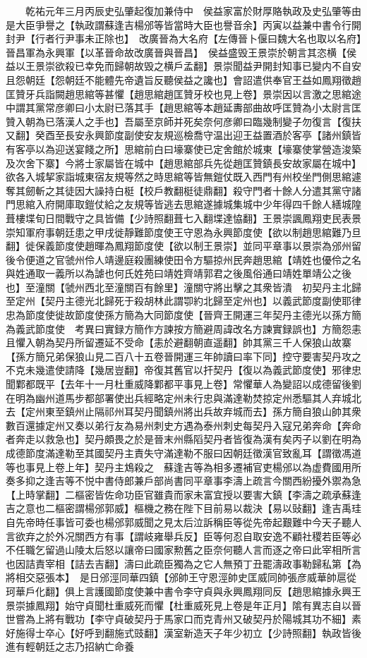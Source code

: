 　　乾祐元年三月丙辰史弘肇起復加兼侍中　侯益家富於財厚賂執政及史弘肇等由是大臣爭譽之【執政謂蘇逢吉楊邠等皆當時大臣也譽音余】丙寅以益兼中書令行開封尹【行者行尹事未正除也】　改廣晉為大名府【左傳晉卜偃曰魏大名也取以名府】晉昌軍為永興軍【以革晉命故改廣晉與晉昌】　侯益盛毁王景崇於朝言其恣横【侯益以王景崇欲殺已幸免而歸朝故毁之横戶孟翻】景崇聞益尹開封知事已變内不自安且怨朝廷【怨朝廷不能體先帝遺旨反聽侯益之讒也】會詔遣供奉官王益如鳳翔徵趙匡贊牙兵詣闕趙思綰等甚懼【趙思綰趙匡贊牙校也見上卷】景崇因以言激之思綰途中謂其黨常彦卿曰小太尉已落其手【趙思綰等本趙延夀部曲故呼匡贊為小太尉言匡贊入朝為已落漢人之手也】吾屬至京師并死矣奈何彦卿曰臨幾制變子勿復言【復扶又翻】癸酉至長安永興節度副使安友規巡檢喬守温出迎王益置酒於客亭【諸州鎮皆有客亭以為迎送宴餞之所】思綰前白曰壕寨使已定舍館於城東【壕寨使掌營造浚築及次舍下寨】今將士家屬皆在城中【趙思綰部兵先從趙匡贊鎮長安故家屬在城中】欲各入城挈家詣城東宿友規等然之時思綰等皆無鎧仗既入西門有州校坐門側思綰遽奪其劒斬之其徒因大譟持白梃【校戶教翻梃徒鼎翻】殺守門者十餘人分遣其黨守諸門思綰入府開庫取鎧仗給之友規等皆逃去思綰遂據城集城中少年得四千餘人繕城隍葺樓堞旬日間戰守之具皆備【少詩照翻葺七入翻堞達恊翻】王景崇諷鳳翔吏民表景崇知軍府事朝廷患之甲戌徙靜難節度使王守恩為永興節度使【欲以制趙思綰難乃旦翻】徙保義節度使趙暉為鳳翔節度使【欲以制王景崇】並同平章事以景崇為邠州留後令便道之官虢州伶人靖邊庭殺團練使田令方驅掠州民奔趙思綰【靖姓也優伶之名與姓通取一義所以為謔也何氏姓苑曰靖姓齊靖郭君之後風俗通曰靖姓單靖公之後也】至潼關【虢州西北至潼關百有餘里】潼關守將出擊之其衆皆潰　初契丹主北歸至定州【契丹主德光北歸死于殺胡林此謂卾約北歸至定州也】以義武節度副使耶律忠為節度使徙故節度使孫方簡為大同節度使【晉齊王開運三年契丹主德光以孫方簡為義武節度使　考異曰實録方簡作方諫按方簡避周諱改名方諫實録誤也】方簡怨恚且懼入朝為契丹所留遷延不受命【恚於避翻朝直遥翻】帥其黨三千人保狼山故寨【孫方簡兄弟保狼山見二百八十五卷晉開運三年帥讀曰率下同】控守要害契丹攻之不克未幾遣使請降【幾居豈翻】帝復其舊官以扞契丹【復以為義武節度使】邪律忠聞鄴都既平【去年十一月杜重威降鄴都平事見上卷】常懼華人為變詔以成德留後劉在明為幽州道馬步都部署使出兵經略定州未行忠與滿達勒焚掠定州悉驅其人弃城北去【定州東至鎮州止隔祁州耳契丹聞鎮州將出兵故弃城而去】孫方簡自狼山帥其衆數百還據定州又奏以弟行友為易州刺史方遇為泰州刺史每契丹入寇兄弟奔命【奔命者奔走以救急也】契丹頗畏之於是晉末州縣䧟契丹者皆復為漢有矣丙子以劉在明為成德節度滿達勒至其國契丹主責失守滿達勒不服曰因朝廷徵漢官致亂耳【謂徵馮道等也事見上卷上年】契丹主鴆殺之　蘇逢吉等為相多遷補官吏楊邠以為虚費國用所奏多抑之逢吉等不悦中書侍郎兼戶部尚書同平章事李濤上疏言今關西紛擾外禦為急【上時掌翻】二樞密皆佐命功臣官雖貴而家未富宜授以要害大鎮【李濤之疏承蘇逢吉之意也二樞密謂楊邠郭威】樞機之務在陛下目前易以裁決【易以䜴翻】逢吉禹珪自先帝時任事皆可委也楊邠郭威聞之見太后泣訴稱臣等從先帝起艱難中今天子聽人言欲弃之於外况關西方有事【謂岐雍舉兵反】臣等何忍自取安逸不顧社稷若臣等必不任職乞留過山陵太后怒以讓帝曰國家勲舊之臣奈何聽人言而逐之帝曰此宰相所言也因詰責宰相【詰去吉翻】濤曰此疏臣獨為之它人無預丁丑罷濤政事勒歸私第【為將相交惡張本】　是日邠涇同華四鎮【邠帥王守恩涇帥史匡威同帥張彦威華帥扈從珂華戶化翻】俱上言護國節度使兼中書令李守貞與永興鳳翔同反【趙思綰據永興王景崇據鳳翔】始守貞聞杜重威死而懼【杜重威死見上卷是年正月】隂有異志自以晉世嘗為上將有戰功【李守貞破契丹于馬家口而克青州又破契丹於陽城其功不細】素好施得士卒心【好呼到翻施式豉翻】漢室新造天子年少初立【少詩照翻】執政皆後進有輕朝廷之志乃招納亡命養